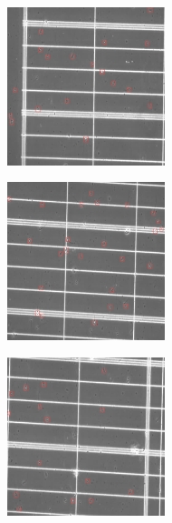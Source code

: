 \documentclass{article}
\begin{document}
\begin{figure}[H]
  \centering
  \begin{subfigure}{4.6cm}
    \centering\includegraphics[width=4.6cm]{Data218_frame0_pred.jpg}
  \end{subfigure}
  \begin{subfigure}{4.6cm}
    \centering\includegraphics[width=4.6cm]{Data216_frame0_pred.jpg}
  \end{subfigure}
  \begin{subfigure}{4.6cm}
    \centering\includegraphics[width=4.6cm]{Data217_frame0_pred.jpg}
  \end{subfigure}
  \\
  

\end{figure}
\end{document}
